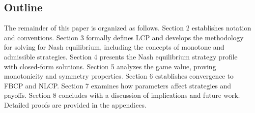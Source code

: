 \documentclass[../../main/main.tex]{subfiles}
\begin{document}
\subsection{Outline}

The remainder of this paper is organized as follows. Section 2 establishes notation and conventions. Section 3 formally defines LCP and develops the methodology for solving for Nash equilibrium, including the concepts of monotone and admissible strategies. Section 4 presents the Nash equilibrium strategy profile with closed-form solutions. Section 5 analyzes the game value, proving monotonicity and symmetry properties. Section 6 establishes convergence to FBCP and NLCP. Section 7 examines how parameters affect strategies and payoffs. Section 8 concludes with a discussion of implications and future work. Detailed proofs are provided in the appendices.
\end{document}

